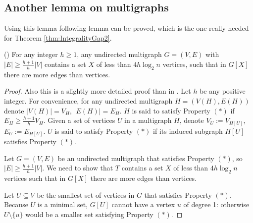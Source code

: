 \subsection{Another lemma on multigraphs}\label{subsec:lemma2}

Using this lemma following lemma can be proved, which is the one really needed for Theorem \ref{thm:IntegralityGap2}.
%
\begin{lemma}\label{lem:BermanMIS2}
(\cite[Lemma 3.2]{BermanMIS}) For any integer $h \geq 1$, any undirected multigraph $G = (V,E)$ with $|E| \geq \frac{h+1}{h} |V|$ contains a set $X$ of less than $4 h \log_2 n$ vertices, such that in $G[X]$ there are more edges than vertices.
\end{lemma}
%
\begin{proof}
Also this is a slightly more detailed proof than in \cite{BermanMIS}. Let $h$ be any positive integer. For convenience, for any undirected multigraph $H = (V(H),E(H))$ denote $|V(H)| = V_H$, $|E(H)| = E_H$. $H$ is said to satisfy Property $(*)$ if $E_H \geq \frac{h+1}{h} V_H$. Given a set of vertices $U$ in a multigraph $H$, denote $V_U := V_{H[U]}$, $E_U := E_{H[U]}$. $U$ is said to satisfy Property $(*)$ if its induced subgraph $H[U]$ satisfies Property $(*)$.

Let $G = (V,E)$ be an undirected multigraph that satisfies Property $(*)$, so $|E| \geq \frac{h+1}{h} |V|$. We need to show that $T$ contains a set $X$ of less than $4h \log_2 n$ vertices such that in $G[X]$ there are more edges than vertices.

Let $U \subseteq V$ be the smallest set of vertices in $G$ that satisfies Property $(*)$. Because $U$ is a minimal set, $G[U]$ cannot have a vertex $u$ of degree 1: otherwise $U \setminus \{u\}$ would be a smaller set satisfying Property $(*)$.


\end{proof}
